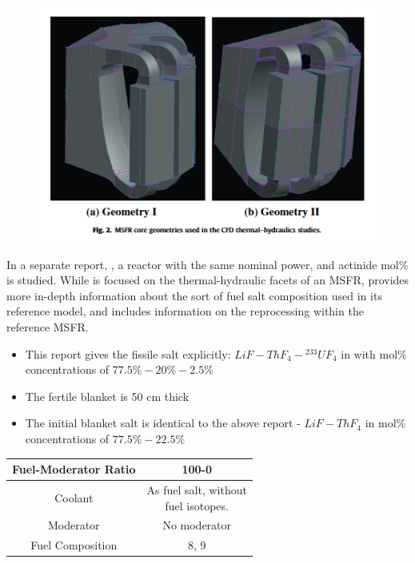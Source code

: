 \documentclass[letterpaper]{article}
\begin{document}
\begin{figure}[H]
  \centering
  \includegraphics[width=1.0\linewidth]{figures/MSFRsource1.png}
  \label{fig:fig10}
\end{figure}


In a separate report, \cite{doligez_coupled_2014} , a reactor with the same nominal power, and actinide mol\% is studied.   While \cite{rouch_preliminary_2014} is focused on the thermal-hydraulic facets of an MSFR, \cite{doligez_coupled_2014} provides more in-depth information about the sort of fuel salt composition used in its reference model, and includes information on the reprocessing within the reference MSFR.

\begin{itemize}
\item This report gives the fissile salt explicitly: $LiF - ThF_4 - {}^{233}UF_4$ in with mol\% concentrations of $77.5\% - 20\% - 2.5\%$
\item The fertile blanket is 50 cm thick
\item The initial blanket salt is identical to the above report - $LiF - ThF_4$ in mol\% concentrations of $77.5\% - 22.5\%$

\end{itemize}
\begin{center}
\begin{tabular}{|c|c|}
\hline
Fuel-Moderator Ratio & 100-0 \\
\hline
Coolant & \makecell{As fuel salt, without\\fuel isotopes.} \\
\hline
Moderator & No moderator \\
\hline
Fuel Composition & 8, 9 \\
\hline
\end{tabular}
\end{center}
\end{document}
